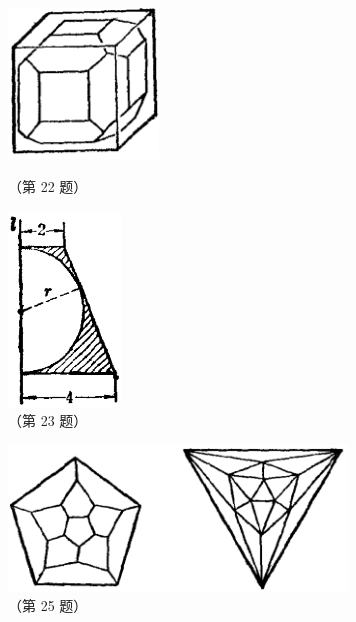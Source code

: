 \begin{xiaotis}
\begin{enhancedline}
\begin{figure}[htbp]
    \centering
    \begin{minipage}[b]{7cm}
        \centering
        \includegraphics[width=4cm]{../pic/ltjh-zongfuxi-22.png}
        \caption*{（第 22 题）}
    \end{minipage}
    \qquad
    \begin{minipage}[b]{7cm}
        \centering
        \includegraphics[width=3cm]{../pic/ltjh-zongfuxi-23.png}
        \caption*{（第 23 题）}
    \end{minipage}
\end{figure}



\begin{withstar}


\begin{figure}[htbp]
    \centering
    \includegraphics[width=9cm]{../pic/ltjh-zongfuxi-25.png}
    \caption*{（第 25 题）}
\end{figure}


\end{withstar}
\end{enhancedline}
\end{xiaotis}
